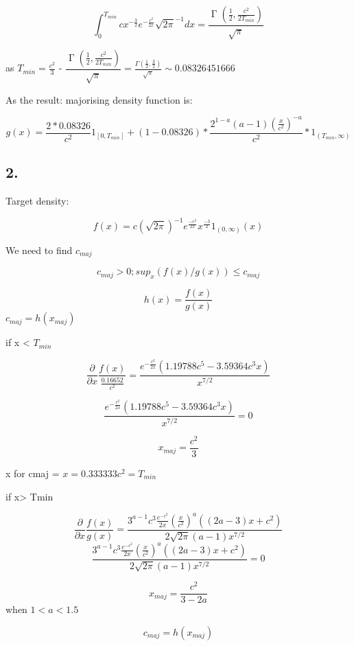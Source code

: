 \documentclass[
]{article}
\begin{document}
\[\int_0^{T_{min}} c x^{-\frac{3}{2}} e^{-\frac{c^2}{2 x}} {\sqrt{2 \pi }}^{-1}  dx = \dfrac{\operatorname{\Gamma}\left(\frac{1}{2},\frac{c^2}{2T_{min}}\right)}{\sqrt{{\pi}}}\]

as \(T_{min} = \frac {c^2} 3\) -
\(\dfrac{\operatorname{\Gamma}\left(\frac{1}{2},\frac{c^2}{2T_{min}}\right)}{\sqrt{{\pi}}} = \frac{\Gamma \left(\frac{1}{2},\frac{3}{2}\right)}{\sqrt{\pi }} \sim 0.08326451666\)

As the result: majorising density function is:

\[
g(x) =  \frac{2 * 0.08326}{c^2} 1_{[0,T_{min}]} + (1-0.08326)* \frac{2^{1-a} (a-1) \left(\frac{x}{c^2}\right)^{-a}}{c^2} * 1_{(T_{min},\infty)}
\]

\hypertarget{section}{%
\subsection{2.}\label{section}}

Target density:

\[f(x) = c(\sqrt{2\pi})^{-1} e^{\frac {-c^2} {2x}} x^{ \frac {-3}{2}} 1_{(0,\infty)}(x)\]

We need to find \(c_{maj}\)

\[c_{maj}>0;sup_x(f(x)/g(x)) \le c_{maj}\]

\[h(x) = \frac {f(x)}  {g(x)}\] \(c_{maj} = h(x_{maj})\)

if x \textless{} \(T_{min}\)

\[\frac {\partial}{\partial x} \frac{f(x)}{\frac{0.16652}{c^2}} = \frac{e^{-\frac{c^2}{2 x}} \left(1.19788 c^5-3.59364 c^3 x\right)}{x^{7/2}}\]

\[\frac{e^{-\frac{c^2}{2 x}} \left(1.19788 c^5-3.59364 c^3 x\right)}{x^{7/2}} = 0\]

\[x_{maj}=\frac{c^2}{3}\]

x for cmaj = \(x=0.333333 c^2 = T_{min}\)

if x\textgreater{} Tmin

\[\frac {\partial}{\partial x} \frac{f(x)}{g(x)} = \frac{3^{a-1} c^3 \frac{e^{-c^2}}{2 x} \left(\frac{x}{c^2}\right)^a \left((2 a-3) x+c^2\right)}{2 \sqrt{2 \pi } (a-1) x^{7/2}}\]
\[\frac{3^{a-1} c^3 \frac{e^{-c^2}}{2 x} \left(\frac{x}{c^2}\right)^a \left((2 a-3) x+c^2\right)}{2 \sqrt{2 \pi } (a-1) x^{7/2}} = 0\]

\[ x_{maj}=\frac{c^2}{3-2 a}\] when \(1<a<1.5\)

\[c_{maj} = h(x_{maj})\]
\end{document}
